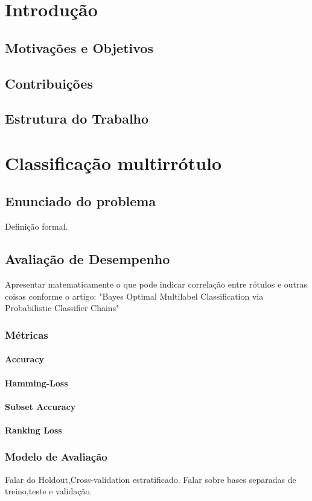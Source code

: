 \chapter{Introdução}
\section{Motivações e Objetivos}
\section{Contribuições}
\section{Estrutura do Trabalho}

\chapter{Classificação multirrótulo}

\section{Enunciado do problema}
Definição formal.

\section{Avaliação de Desempenho}
Apresentar matematicamente o que pode indicar correlação entre rótulos e outras coisas
conforme o artigo: "Bayes Optimal Multilabel Classification via Probabilistic Classifier Chains"
\subsection{Métricas}
\subsubsection{Accuracy}
\subsubsection{Hamming-Loss}
\subsubsection{Subset Accuracy}
\subsubsection{Ranking Loss}
\subsection{Modelo de Avaliação}
Falar do Holdout,Cross-validation estratificado.
Falar sobre bases separadas de treino,teste e validação.

